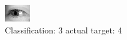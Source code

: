 \begin{figure}[h!]
\begin{center}
\includegraphics[width=0.60\columnwidth]{figures/ID3216_class_3_target_4.png}
\end{center}
\caption{ Classification: 3 actual target: 4}
\label{fig:ID3216_class_3_target_4}
\end{figure}
